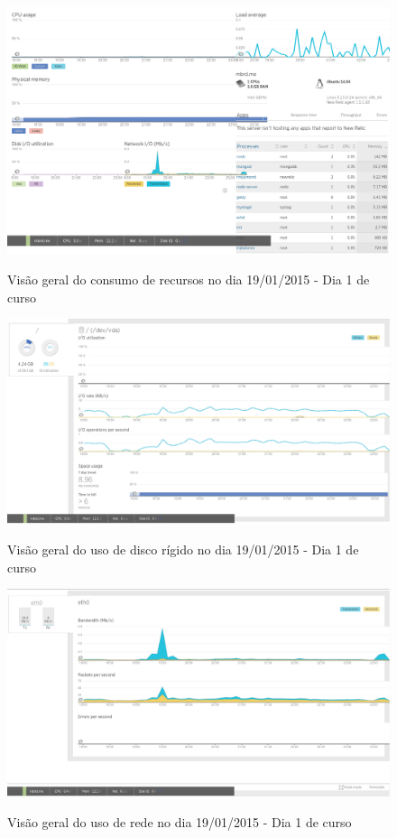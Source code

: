 \documentclass[
	12pt,				%
	oneside,			%
	a4paper,			%
	english,			%
	brazil				%
	]{abntex2ppgsi}
\begin{document}
\begin{apendicesenv}
\begin{figure}[ht]
\centering
\caption{Visão geral do consumo de recursos no dia 19/01/2015 - Dia 1 de curso}
\includegraphics[width=1.0\textwidth]{relatorios/19-01-15/dashboard_cropped.pdf} 
\label{fig:recursos_dia1_1} 
\end{figure}

\begin{figure}[ht]
\centering
\caption{Visão geral do uso de disco rígido no dia 19/01/2015 - Dia 1 de curso}
\includegraphics[width=1.0\textwidth]{relatorios/19-01-15/disk_cropped.pdf} 
\label{fig:recursos_dia1_2} 
\end{figure}

\begin{figure}[ht]
\centering
\caption{Visão geral do uso de rede no dia 19/01/2015 - Dia 1 de curso}
\includegraphics[width=1.0\textwidth]{relatorios/19-01-15/network_cropped.pdf} 
\label{fig:recursos_dia1_3} 
\end{figure}


\end{apendicesenv}
\end{document}
